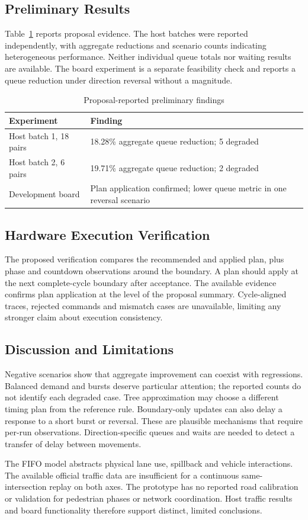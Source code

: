 \subsection{Preliminary Results}
Table~\ref{tab:results} reports proposal evidence. The host batches were reported independently, with aggregate reductions and scenario counts indicating heterogeneous performance. Neither individual queue totals nor waiting results are available. The board experiment is a separate feasibility check and reports a queue reduction under direction reversal without a magnitude.

\begin{table}[t]
\caption{Proposal-reported preliminary findings}
\label{tab:results}\centering\footnotesize
\begin{tabular}{@{}p{}p{}@{}}
\toprule Experiment & Finding\\ \midrule
Host batch 1, 18 pairs & 18.28\% aggregate queue reduction; 5 degraded\\
Host batch 2, 6 pairs & 19.71\% aggregate queue reduction; 2 degraded\\
Development board & Plan application confirmed; lower queue metric in one reversal scenario\\
\bottomrule
\end{tabular}
\end{table}

\subsection{Hardware Execution Verification}
The proposed verification compares the recommended and applied plan, plus phase and countdown observations around the boundary. A plan should apply at the next complete-cycle boundary after acceptance. The available evidence confirms plan application at the level of the proposal summary. Cycle-aligned traces, rejected commands and mismatch cases are unavailable, limiting any stronger claim about execution consistency.

\subsection{Discussion and Limitations}
Negative scenarios show that aggregate improvement can coexist with regressions. Balanced demand and bursts deserve particular attention; the reported counts do not identify each degraded case. Tree approximation may choose a different timing plan from the reference rule. Boundary-only updates can also delay a response to a short burst or reversal. These are plausible mechanisms that require per-run observations. Direction-specific queues and waits are needed to detect a transfer of delay between movements.

The FIFO model abstracts physical lane use, spillback and vehicle interactions. The available official traffic data are insufficient for a continuous same-intersection replay on both axes. The prototype has no reported road calibration or validation for pedestrian phases or network coordination. Host traffic results and board functionality therefore support distinct, limited conclusions.
